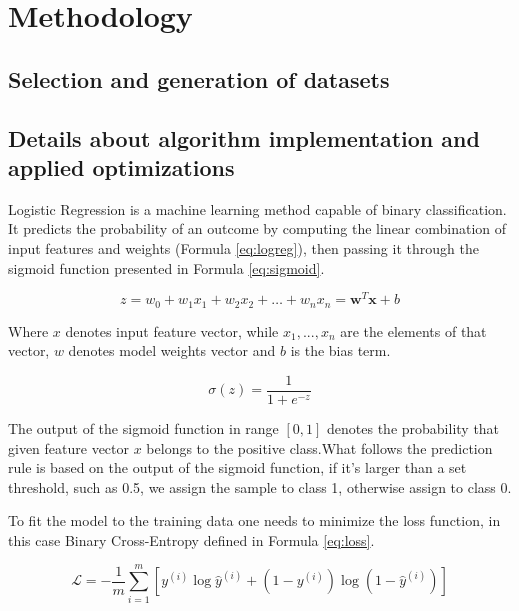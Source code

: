 \documentclass[12pt]{article}
\begin{document}
\section{Methodology}

\subsection{Selection and generation of datasets}

\subsection{Details about algorithm implementation and applied optimizations}

Logistic Regression is a machine learning method capable of binary classification. It predicts the probability of an outcome by computing the linear combination of input features and weights (Formula \ref{eq:logreg}), then passing it through the sigmoid function presented in Formula \ref{eq:sigmoid}. 

\begin{equation}\label{eq:logreg}
    z = w_0 + w_1 x_1 + w_2 x_2 + \dots + w_n x_n = \mathbf{w}^T \mathbf{x} + b    
\end{equation}


Where $x$ denotes input feature vector, while $x_1,...,x_n$ are the elements of that vector, $w$ denotes model weights vector and $b$ is the bias term.  



\begin{equation}\label{eq:sigmoid}
    \sigma(z) = \frac{1}{1 + e^{-z}}
\end{equation}

The output of the sigmoid function in range $[0,1]$ denotes the probability that given feature vector $x$ belongs to the positive class.What follows the prediction rule is based on the output of the sigmoid function, if it's larger than a set threshold, such as 0.5, we assign the sample to class 1, otherwise assign to class 0.

To fit the model to the training data one needs to minimize the loss function, in this case Binary Cross-Entropy defined in Formula \ref{eq:loss}.

\begin{equation}\label{eq:loss}
    \mathcal{L} = -\frac{1}{m} \sum_{i=1}^{m} \left[ y^{(i)} \log \hat{y}^{(i)} + \left(1 - y^{(i)}\right) \log \left(1 - \hat{y}^{(i)}\right) \right]
\end{equation}
\end{document}
